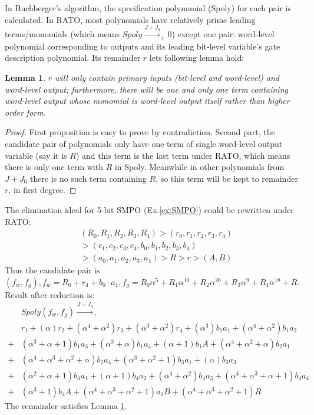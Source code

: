 \documentclass{acm_proc_article-sp}
\newtheorem{Lemma}{Lemma}
\begin{document}
In Buchberger's algorithm, the specification polynomial (Spoly) for each pair is calculated. In RATO, most polynomials
have relatively prime leading terms/monomials (which means $Spoly \xrightarrow{J+J_0}_{+} 0$) except one pair:
word-level polynomial corresponding to outputs and its leading bit-level variable's gate description polynomial.
Its remainder $r$ lets following lemma hold:

\begin{Lemma}
\label{lem:1}
$r$ will only contain primary inputs (bit-level and word-level) and word-level output; furthermore, there will be one and
only one term containing word-level output whose monomial is word-level output itself rather than higher order form.
\end{Lemma}

\begin{proof}
First proposition is easy to prove by contradiction. Second part, the candidate pair of polynomials only have one term of
single word-level output variable (say it is $R$) and this term is the last term under RATO, which means there is only one term with
$R$ in Spoly. Meanwhile in other polynomials from $J+J_0$ there is no such term containing $R$, so this term will be
kept to remainder $r$, in first degree.
\end{proof}

\begin{Example}
The elimination ideal for 5-bit SMPO (Ex.\ref{ex:SMPO}) could be rewritten under RATO:
\begin{align}
&(R_0,R_1,R_2,R_3,R_4)>(r_0,r_1,r_2,r_3,r_4)\nonumber\\&>(c_1,c_2,c_3,c_4,b_0,b_1,b_2,b_3,b_4)\nonumber\\
&>(a_0,a_1,a_2,a_3,a_4)>R>r>(A,B)\nonumber
\end{align}
Thus the candidate pair is
$(f_w,f_g), f_w = R_0+r_4+b_0\cdot a_1, f_g =R_0\alpha^5+R_1\alpha^{10}+R_2\alpha^{20}+R_3\alpha^9+R_4\alpha^{18} + R$.
Result after reduction is:
\begin{align}
&Spoly(f_w,f_g) \xrightarrow{J+J_0}_{+}\nonumber\\
&r_1+(\alpha)r_2+(\alpha^4+\alpha^2)r_3+(\alpha^3+\alpha^2)r_4+(\alpha^3)b_1a_1+(\alpha^4+\alpha^2)b_1a_2\nonumber\\
+&(\alpha^3+\alpha+1)b_1a_3+(\alpha^3+\alpha)b_1a_4+(\alpha+1)b_1A+(\alpha^4+\alpha^2+\alpha)b_2a_1\nonumber\\
+&(\alpha^4+\alpha^3+\alpha^2+\alpha)b_2a_4+(\alpha^3+\alpha^2+1)b_3a_1+(\alpha)b_3a_3\nonumber\\
+&(\alpha^2+\alpha+1)b_4a_1+(\alpha+1)b_4a_2+(\alpha^4+\alpha^2)b_4a_3+(\alpha^4+\alpha^3+\alpha+1)b_4a_4\nonumber\\
+&(\alpha^3+1)b_4A+(\alpha^4+\alpha^3+\alpha^2+1)a_1B+(\alpha^4+\alpha^3+\alpha^2+1)R\nonumber
\end{align}
The remainder satisfies Lemma \ref{lem:1}.
\end{Example}
\end{document}

